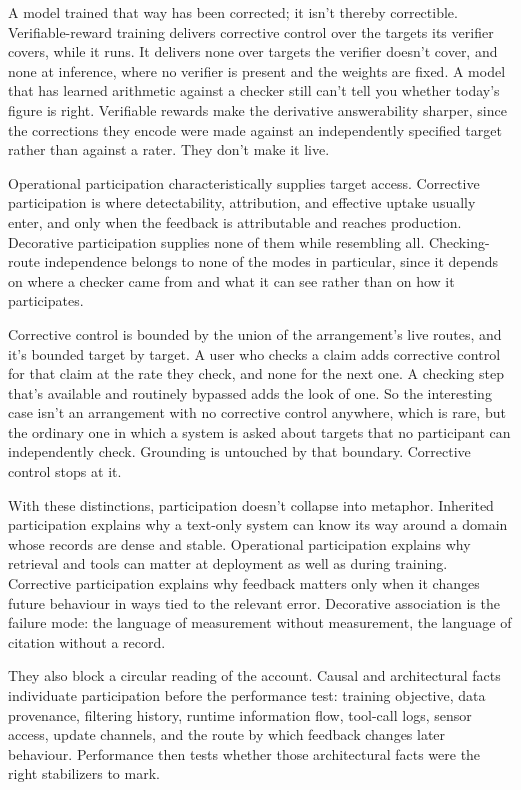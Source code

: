 \documentclass[12pt]{article}
\begin{document}
A model trained that way has been corrected; it isn't thereby correctible.
Verifiable-reward training delivers corrective control over the targets its verifier
covers, while it runs. It delivers none over targets the verifier doesn't cover, and none
at inference, where no verifier is present and the weights are fixed. A model that has
learned arithmetic against a checker still can't tell you whether today's figure is right.
Verifiable rewards make the derivative answerability sharper, since the corrections they
encode were made against an independently specified target rather than against a rater.
They don't make it live.

Operational participation characteristically supplies target access. Corrective
participation is where detectability, attribution, and effective uptake usually enter, and
only when the feedback is attributable and reaches production. Decorative participation
supplies none of them while resembling all. Checking-route independence belongs to none of
the modes in particular, since it depends on where a checker came from and what it can see
rather than on how it participates.

Corrective control is bounded by the union of the arrangement's live routes, and it's
bounded target by target. A user who checks a claim adds corrective control for that
claim at the rate they check, and none for the next one. A checking step that's available
and routinely bypassed adds the look of one. So the interesting case isn't an arrangement with no
corrective control anywhere, which is rare, but the ordinary one in which a system is
asked about targets that no participant can independently check. Grounding is untouched by
that boundary. Corrective control stops at it.

With these distinctions, participation doesn't collapse into metaphor. Inherited
participation explains why a text-only system can know its way around a domain whose
records are dense and stable. Operational participation explains why retrieval and tools
can matter at deployment as well as during training. Corrective participation explains why
feedback matters only when it changes future behaviour in ways tied to the relevant
error. Decorative association is the failure mode: the language of measurement without
measurement, the language of citation without a record.

They also block a circular reading of the account. Causal and architectural facts
individuate participation before the performance test: training objective, data
provenance, filtering history, runtime information flow, tool-call logs, sensor access,
update channels, and the route by which feedback changes later behaviour. Performance
then tests whether those architectural facts were the right stabilizers to mark.
\end{document}
